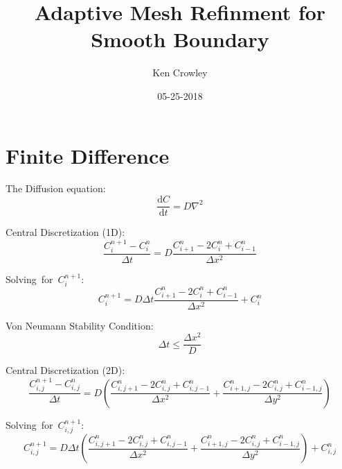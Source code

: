 \documentclass{article}
\title{Adaptive Mesh Refinment for Smooth Boundary}
\date{05-25-2018}
\author{Ken Crowley}
\begin{document}
	
	\maketitle
	\newpage
	\tableofcontents
	\newpage

	\centering
	\section{Finite Difference}
	The Diffusion equation:
	\begin{equation}
	\frac{\mathrm{d}C}{\mathrm{d}t} = D\nabla^2
	\end{equation}

	Central Discretization (1D):
	\begin{equation}
	\frac{C_i^{n+1}-C_i^n}{\Delta t} = D \frac{C_{i+1}^n-2C_i^n+C_{i-1}^n}{\Delta x^2}
	\end{equation}

	\mbox {Solving for $C_i^{n+1}$}:
	\begin{equation}
	C_i^{n+1} = D \Delta t \frac{C_{i+1}^n-2C_i^n+C_{i-1}^n}{\Delta x^2} + C_i^n
	\end{equation}

	Von Neumann Stability Condition:
	\begin{equation}
	\Delta t \leq\frac{\Delta x^2}{D}
	\end{equation}

	Central Discretization (2D):
	\begin{equation}	
	\frac{C_{i,j}^{n+1}-C_{i,j}^n}{\Delta t} = D (\frac{C_{i,j+1}^n-2C_{i,j}^n+C_{i,j-1}^n}{\Delta x^2} + \frac{C_{i+1,j}^n-2C_{i,j}^n+C_{i-1,j}^n}{\Delta y^2})
	\end{equation}

	\mbox {Solving for $C_{i,j}^{n+1}$}:
	\begin{equation}
	C_{i,j}^{n+1} = D \Delta t(\frac{C_{i,j+1}^n-2C_{i,j}^n+C_{i,j-1}^n}{\Delta x^2} + \frac{C_{i+1,j}^n-2C_{i,j}^n+C_{i-1,j}^n}{\Delta y^2}) + C_{i,j}^n
	\end{equation}
\end{document}
